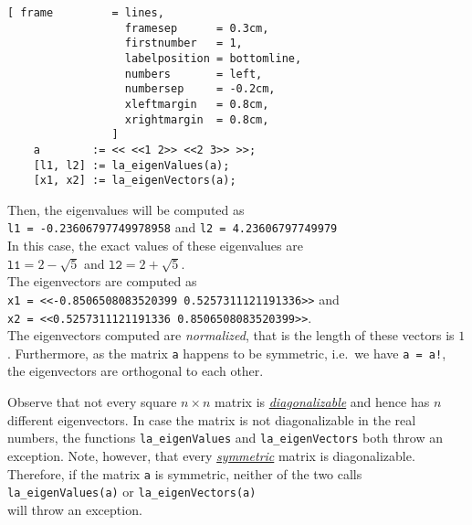 \begin{Verbatim}[ frame         = lines, 
                  framesep      = 0.3cm, 
                  firstnumber   = 1,
                  labelposition = bottomline,
                  numbers       = left,
                  numbersep     = -0.2cm,
                  xleftmargin   = 0.8cm,
                  xrightmargin  = 0.8cm,
                ]
    a        := << <<1 2>> <<2 3>> >>;
    [l1, l2] := la_eigenValues(a);
    [x1, x2] := la_eigenVectors(a);
\end{Verbatim}

Then, the eigenvalues will be computed as
\\[0.2cm]
\hspace*{1.3cm}
\texttt{l1 = -0.23606797749978958} \quad and \quad \texttt{l2 = 4.23606797749979}
\\[0.2cm]
In this case, the exact values of these eigenvalues are 
\\[0.2cm]
\hspace*{1.3cm}
$\mathtt{l1} = 2 - \sqrt{5}$ \quad and \quad $\mathtt{l2} = 2 + \sqrt{5}$.
\\[0.2cm]
The eigenvectors are computed as 
\\[0.2cm]
\hspace*{1.3cm}
\texttt{x1 = <<-0.8506508083520399 0.5257311121191336>>} \quad and \\
\hspace*{1.3cm}
\texttt{x2 = <<0.5257311121191336 0.8506508083520399>>}.
\\[0.2cm]
The eigenvectors computed are \emph{normalized}, that is the length of these vectors is $1$.
Furthermore, as the matrix \texttt{a} happens to be symmetric, i.e.~we have \texttt{a = a!},
the eigenvectors are orthogonal to each other.

Observe that not every square $n \times n$ matrix is 
\href{http://en.wikipedia.org/wiki/Diagonalizable_matrix}{\emph{diagonalizable}}
and hence has $n$ different eigenvectors.  In case the matrix is not diagonalizable in the real
numbers, the functions \texttt{la\_eigenValues} and \texttt{la\_eigenVectors} both throw an
exception.  Note, however, that every 
\href{http://en.wikipedia.org/wiki/Symmetric_matrix}{\emph{symmetric}} matrix is diagonalizable.
Therefore, if the matrix \texttt{a} is symmetric, neither of the two calls
\\[0.2cm]
\hspace*{1.3cm}
\texttt{la\_eigenValues(a)} \quad or \quad \texttt{la\_eigenVectors(a)}
\\[0.2cm]
will throw an exception.





